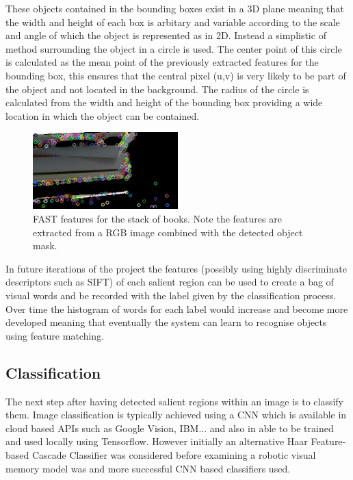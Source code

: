 \documentclass{mproj}
\begin{document}
These objects contained in the bounding boxes exist in a 3D plane meaning that the width and height of each box is arbitary and variable according to the scale and angle of which the object is represented as in 2D. Instead a simplistic of method surrounding the object in a circle is used. The center point of this circle is calculated as the mean point of the previously extracted features for the bounding box, this ensures that the central pixel (u,v) is very likely to be part of the object and not located in the background. The radius of the circle is calculated from the width and height of the bounding box providing a wide location in which the object can be contained.

\begin{figure}
   \caption{FAST features for the stack of books. Note the features are extracted from a RGB image combined with the detected object mask.}
   \centering
   \includegraphics[width=0.5\textwidth]{images/fast.png}
   
\end{figure}

In future iterations of the project the features (possibly using highly discriminate descriptors such as SIFT) of each salient region can be used to create a bag of visual words and be recorded with the label given by the classification process. Over time the histogram of words for each label would increase and become more developed meaning that eventually the system can learn to recognise objects using feature matching. 


\subsection{Classification}

The next step after having detected salient regions within an image is to classify them. Image classification is typically achieved using a CNN which is available in cloud based APIs such as Google Vision, IBM... and also in able to be trained and used locally using Tensorflow. However initially an alternative Haar Feature-based Cascade Classifier was considered before examining a robotic visual memory model was and more successful CNN based classifiers used.
\end{document}
